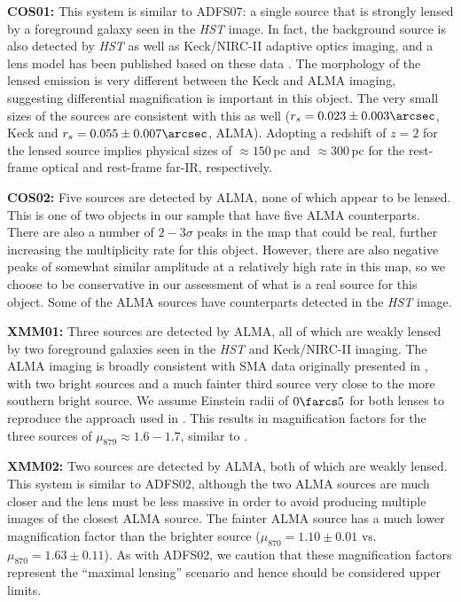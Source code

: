 \documentclass[iop]{emulateapj}
\begin{document}
{\bf COS01:} This system is similar to ADFS07: a single source that is strongly
lensed by a foreground galaxy seen in the {\it HST} image.  In fact, the
background source is also detected by {\it HST} as well as Keck/NIRC-II
adaptive optics imaging, and a lens model has been published based on these
data \citep{Calanog:2014lr}.  The morphology of the lensed emission is very
different between the Keck and ALMA imaging, suggesting differential
magnification is important in this object.  The very small sizes of the sources
are consistent with this as well ($r_s = 0.023 \pm 0.003\arcsec$, Keck and $r_s
= 0.055 \pm 0.007\arcsec$, ALMA).  Adopting a redshift of $z=2$ for the lensed
source implies physical sizes of $\approx 150\,$pc and $\approx 300\,$pc for
the rest-frame optical and rest-frame far-IR, respectively.

{\bf COS02:} Five sources are detected by ALMA, none of which appear to be
lensed.  This is one of two objects in our sample that have five ALMA
counterparts.  There are also a number of $2-3\sigma$ peaks in the map that
could be real, further increasing the multiplicity rate for this object.
However, there are also negative peaks of somewhat similar amplitude at a
relatively high rate in this map, so we choose to be conservative in our
assessment of what is a real source for this object.  Some of the ALMA sources
have counterparts detected in the {\it HST} image.

{\bf XMM01:} Three sources are detected by ALMA, all of which are weakly lensed
by two foreground galaxies seen in the {\it HST} and Keck/NIRC-II imaging.  The
ALMA imaging is broadly consistent with SMA data originally presented in
\citet{Fu:2013lr}, with two bright sources and a much fainter third source very
close to the more southern bright source.  We assume Einstein radii of
$0\farcs5$ for both lenses to reproduce the approach used in \citet{Fu:2013lr}.
This results in magnification factors for the three sources of $\mu_{879}
\approx 1.6 - 1.7$, similar to \citet{Fu:2013lr}.

{\bf XMM02:} Two sources are detected by ALMA, both of which are weakly lensed.
This system is similar to ADFS02, although the two ALMA sources are much closer
and the lens must be less massive in order to avoid producing multiple images
of the closest ALMA source.  The fainter ALMA source has a much lower
magnification factor than the brighter source ($\mu_{870} = 1.10 \pm 0.01$ vs.
$\mu_{870} = 1.63 \pm 0.11$).  As with ADFS02, we caution that these
magnification factors represent the ``maximal lensing'' scenario and hence
should be considered upper limits.
\end{document}
